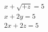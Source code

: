 \documentclass[preview]{standalone}
\begin{document}
\begin{align*}
\begin{array}{r}{x+{\sqrt{+z}}=5}\\ {x+2y=5}\\ {2x+2z=5}\end{array}
\end{align*}
\end{document}
